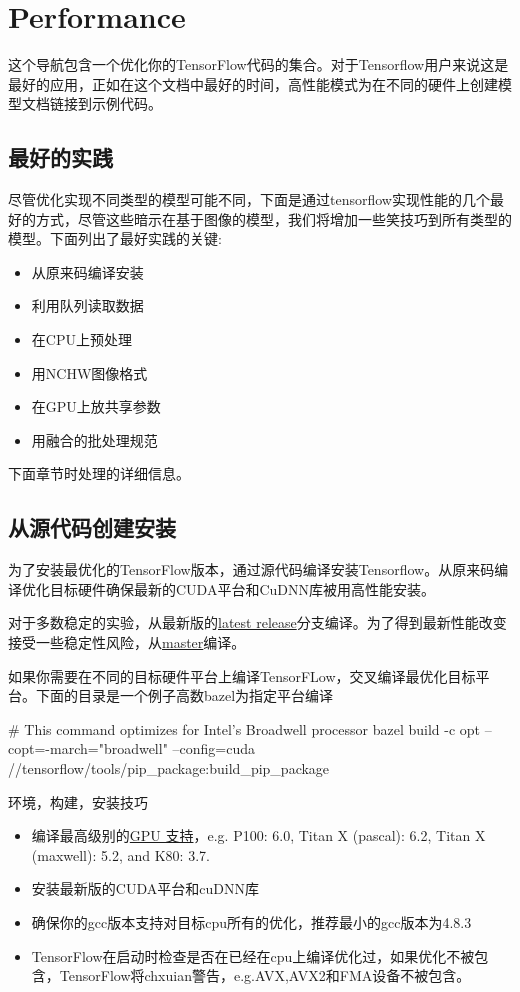 \chapter{Performance}
这个导航包含一个优化你的TensorFlow代码的集合。对于Tensorflow用户来说这是最好的应用，正如在这个文档中最好的时间，高性能模式为在不同的硬件上创建模型文档链接到示例代码。
\section{最好的实践}
尽管优化实现不同类型的模型可能不同，下面是通过tensorflow实现性能的几个最好的方式，尽管这些暗示在基于图像的模型，我们将增加一些笑技巧到所有类型的模型。下面列出了最好实践的关键:
\begin{itemize}
\item 从原来码编译安装
\item 利用队列读取数据
\item 在CPU上预处理
\item 用NCHW图像格式
\item 在GPU上放共享参数
\item 用融合的批处理规范
\end{itemize}
下面章节时处理的详细信息。
\section{从源代码创建安装}
为了安装最优化的TensorFlow版本，通过源代码编译安装Tensorflow。从原来码编译优化目标硬件确保最新的CUDA平台和CuDNN库被用高性能安装。

对于多数稳定的实验，从最新版的\href{https://github.com/tensorflow/tensorflow/releases}{latest release}分支编译。为了得到最新性能改变接受一些稳定性风险，从\href{https://github.com/tensorflow/tensorflow}{master}编译。

  如果你需要在不同的目标硬件平台上编译TensorFLow，交叉编译最优化目标平台。下面的目录是一个例子高数bazel为指定平台编译
\begin{python}
# This command optimizes for Intel’s Broadwell processor
bazel build -c opt --copt=-march="broadwell" --config=cuda //tensorflow/tools/pip_package:build_pip_package
\end{python}
环境，构建，安装技巧
\begin{itemize}
\item 编译最高级别的\href{http://developer.nvidia.com/cuda-gpus}{GPU 支持}，e.g. P100: 6.0, Titan X (pascal): 6.2, Titan X (maxwell): 5.2, and K80: 3.7.
\item 安装最新版的CUDA平台和cuDNN库
\item 确保你的gcc版本支持对目标cpu所有的优化，推荐最小的gcc版本为4.8.3
\item TensorFlow在启动时检查是否在已经在cpu上编译优化过，如果优化不被包含，TensorFlow将chxuian警告，e.g.AVX,AVX2和FMA设备不被包含。
\end{itemize}
